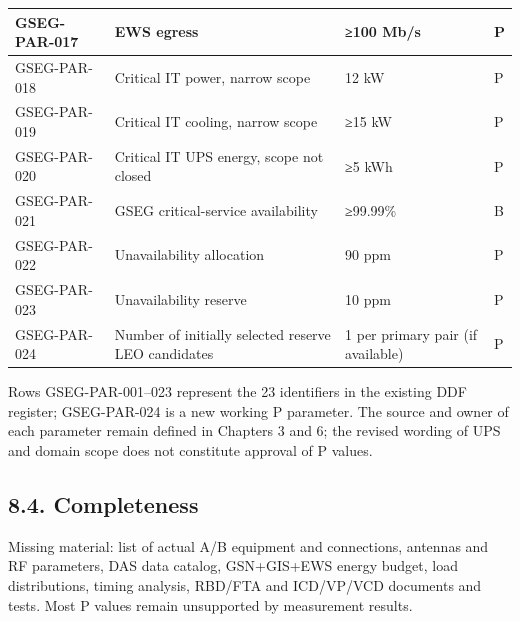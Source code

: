 \begin{longtable}{|P{0.24}|P{0.40}|P{0.24}|P{0.12}|}
GSEG-PAR-017 & EWS egress & ≥100 Mb/\allowbreak{}s & P\\ \hline
GSEG-PAR-018 & Critical IT power, narrow scope & 12 kW & P\\ \hline
GSEG-PAR-019 & Critical IT cooling, narrow scope & ≥15 kW & P\\ \hline
GSEG-PAR-020 & Critical IT UPS energy, scope not closed & ≥5 kWh & P\\ \hline
GSEG-PAR-021 & GSEG critical-service availability & ≥99.99\% & B\\ \hline
GSEG-PAR-022 & Unavailability allocation & 90 ppm & P\\ \hline
GSEG-PAR-023 & Unavailability reserve & 10 ppm & P\\ \hline
GSEG-PAR-024 & Number of initially selected reserve LEO candidates & 1 per primary pair (if available) & P\\*
\end{longtable}
\endgroup

Rows GSEG-PAR-001--023 represent the 23 identifiers in the existing DDF register; GSEG-PAR-024 is a new working P parameter. The source and owner of each parameter remain defined in Chapters 3 and 6; the revised wording of UPS and domain scope does not constitute approval of P values.

\subsection{8.4. Completeness}\label{completeness-status}

Missing material: list of actual A/\allowbreak{}B equipment and connections, antennas and RF parameters, DAS data catalog, GSN+GIS+EWS energy budget, load distributions, timing analysis, RBD/\allowbreak{}FTA and ICD/\allowbreak{}VP/\allowbreak{}VCD documents and tests. Most P values remain unsupported by measurement results.

